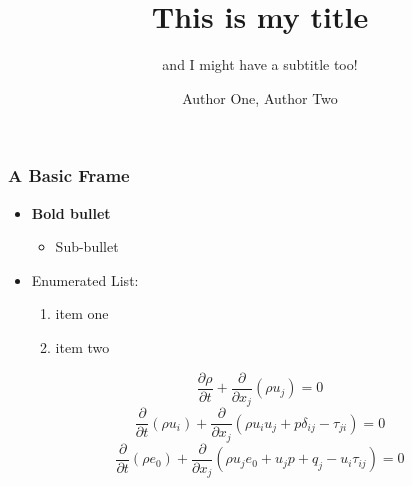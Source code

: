 \documentclass[aspectratio=1610]{beamer}
\begin{document}
\title{This is my title}
\subtitle{and I might have a subtitle too!}
\author{Author One, Author Two}
\begin{NCARtitleframe}%
  \vspace{6em}
  \maketitle
\end{NCARtitleframe}




\begin{frame}
  \frametitle{A Basic Frame}

  \begin{itemize}
  \item \textbf{Bold bullet}
    \begin{itemize}
    \item Sub-bullet
    \end{itemize}
  \item Enumerated List:
    \begin{enumerate}
    \item item one
    \item item two
    \end{enumerate}
  \end{itemize}
  \begin{equation}
    \frac{\partial \rho}{\partial t} +
    \frac{\partial}{\partial x_{j}} (\rho u_{j}) = 0
  \end{equation}
  \begin{equation}
    \frac{\partial}{\partial t} (\rho u_{i}) +
    \frac{\partial}{\partial x_{j}} (\rho u_{i} u_{j} + p \delta_{ij} - \tau_{ji} )
    = 0
  \end{equation}
  \begin{equation}
    \frac{\partial}{\partial t} ( \rho e_{0} ) +
    \frac{\partial}{\partial x_{j}}
    ( \rho u_{j} e_{0} + u_{j} p + q_{j} - u_{i} \tau_{ij} ) = 0
  \end{equation}
\end{frame}
\end{document}
